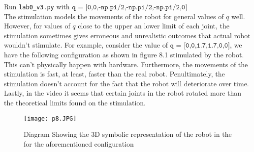 \documentclass{meam520}
\begin{document}
\hwproblem
Run \texttt{lab0\_v3.py} with $\texttt{q = [0,0,-np.pi/2,-np.pi/2,-np.pi/2,0]}$\\ 
\hwproblem
The stimulation models the movements of the robot for general values of $q$ well. However, for values of $q$ close to the upper an lower limit of each joint, the stimulation sometimes gives erroneous and unrealistic outcomes that actual robot wouldn't stimulate. For example, consider the value of $\texttt{q = [0,0,1.7,1.7,0,0]}$, we have the following configuration as shown in figure 8.1 stimulated by the robot. This can't physically happen with hardware. Furthermore, the movements of the stimulation is fast, at least, faster than the real robot. 
Penultimately, the stimulation doesn't account for the fact that the robot will deteriorate over time. 
Lastly, in the video it seems that certain joints in the robot rotated more than the theoretical limits found on the stimulation. 


\renewcommand{\thefigure}{8.1}
\begin{center}
    \begin{figure}[hbt!]
        \centering
        \texttt{[image: p8.JPG]}
         \caption{Diagram Showing the 3D symbolic representation of the robot in the for the aforementioned configuration }
    \end{figure}
\end{center}
\end{document}
